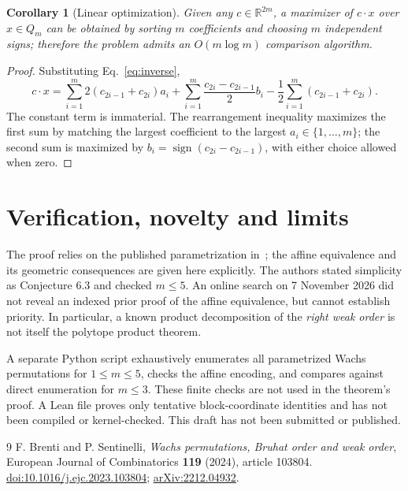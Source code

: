 \documentclass[11pt]{article}
\newtheorem{corollary}{Corollary}
\begin{document}
\begin{corollary}[Linear optimization]
Given any $c\in\mathbb R^{2m}$, a maximizer of $c\cdot x$ over $x\in Q_m$ can be obtained by sorting $m$ coefficients and choosing $m$ independent signs; therefore the problem admits an $O(m\log m)$ comparison algorithm.
\end{corollary}
\begin{proof}
Substituting Eq.~\eqref{eq:inverse},
\[c\cdot x=\sum_{i=1}^m 2(c_{2i-1}+c_{2i})a_i + \sum_{i=1}^m\frac{c_{2i}-c_{2i-1}}2 b_i - \frac12\sum_{i=1}^m(c_{2i-1}+c_{2i}).\]
The constant term is immaterial. The rearrangement inequality maximizes the first sum by matching the largest coefficient to the largest $a_i\in\{1,\ldots,m\}$; the second sum is maximized by $b_i=\operatorname{sign}(c_{2i}-c_{2i-1})$, with either choice allowed when zero.\end{proof}

\section{Verification, novelty and limits}
The proof relies on the published parametrization in~\cite[Proposition 3.2]{BS}; the affine equivalence and its geometric consequences are given here explicitly. The authors stated simplicity as Conjecture 6.3 and checked $m\le5$. An online search on 7 November 2026 did not reveal an indexed prior proof of the affine equivalence, but cannot establish priority. In particular, a known product decomposition of the \emph{right weak order} is not itself the polytope product theorem.

A separate Python script exhaustively enumerates all parametrized Wachs permutations for $1\le m\le5$, checks the affine encoding, and compares against direct enumeration for $m\le3$. These finite checks are not used in the theorem's proof. A Lean file proves only tentative block-coordinate identities and has not been compiled or kernel-checked. This draft has not been submitted or published.

\begin{thebibliography}{9}
 F. Brenti and P. Sentinelli, \emph{Wachs permutations, Bruhat order and weak order}, European Journal of Combinatorics \textbf{119} (2024), article 103804. \href{https://doi.org/10.1016/j.ejc.2023.103804}{doi:10.1016/j.ejc.2023.103804}; \href{https://arxiv.org/abs/2212.04932}{arXiv:2212.04932}.
\end{thebibliography}
\end{document}
